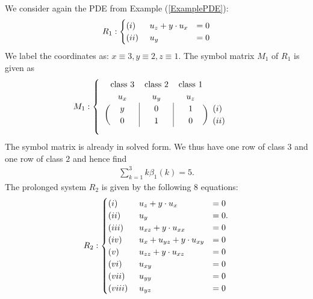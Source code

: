 \begin{example}
We consider again the PDE from Example (\ref{ExamplePDE}):
\begin{align}
    R_1 : \begin{cases} (i)\hphantom{i} \ \ \ \ u_z + y \cdot u_x &= 0\\
                        (ii) \ \ \ \ u_y &= 0
            \end{cases}
\end{align}
We label the coordinates as: $x \equiv 3, y \equiv 2, z \equiv 1$. The symbol matrix $M_1$ of $R_1$ is given as
\begin{align}
M_1 : \begin{cases}
\ \ 
\begin{blockarray}{cccc}
\text{class 3} & \text{class 2} & \text{class 1} \\
u_x & u_y & u_z \\
\begin{block}{(c|c|c)l}
  y & 0 & 1 & (i) \\
  0 & 1 & 0 & (ii) \\
\end{block}
\end{blockarray}
\end{cases}
\end{align}
The symbol matrix is already in solved form. We thus have one row of class $3$ and one row of class $2$ and hence find
\begin{align}
  \sum_{k=1}^3 k\beta_1(k) = 5.  
\end{align}
The prolonged system $R_2$ is given by the following $8$ equations:
\begin{align}
    R_2 : \begin{cases} (i)\hphantom{vii} \ \ \ \   u_z + y \cdot u_x &= 0 \\
                        (ii)\hphantom{vi} \ \ \ \  u_y &= 0. \\
                        (iii)\hphantom{v} \ \ \ \  u_{xz} + y \cdot u_{xx} &= 0 \\
                        (iv)\hphantom{ii} \ \ \ \  u_x + u_{yz} + y \cdot u_{xy} &= 0 \\
                        (v)\hphantom{iii} \ \ \ \  u_{zz} + y \cdot u_{xz} &= 0 \\
                        (vi)\hphantom{ii} \ \ \ \ u_{xy} &= 0 \\
                        (vii)\hphantom{i} \ \ \ \ u_{yy} &= 0 \\
                        (viii) \ \ \ \ u_{yz} &= 0 

\end{cases}
\end{align}
\end{example}
